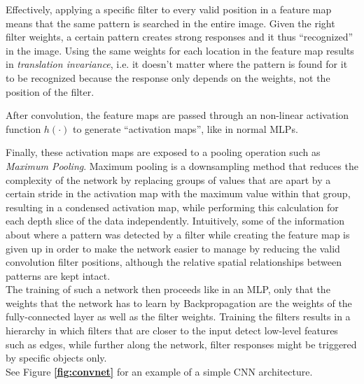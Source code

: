 Effectively, applying a specific filter to every valid position in a feature map means that the same pattern is searched in the entire image. Given the right filter weights, a certain pattern creates strong responses and it thus ``recognized'' in the image. Using the same weights for each location in the feature map results in \textit{translation invariance}, i.e. it doesn't matter where the pattern is found for it to be recognized because the response only depends on the weights, not the position of the filter.

After convolution, the feature maps are passed through an non-linear activation function $h(\cdot)$ to generate ``activation maps'', like in normal MLPs.

\noindent Finally, these activation maps are exposed to a pooling operation such as \textit{Maximum Pooling}. Maximum pooling is a downsampling method that reduces the complexity of the network by replacing groups of values that are apart by a certain stride in the activation map with the maximum value within that group, resulting in a condensed activation map, while performing this calculation for each depth slice of the data independently. Intuitively, some of the information about where a pattern was detected by a filter while creating the feature map is given up in order to make the network easier to manage by reducing the valid convolution filter positions, although the relative spatial relationships between patterns are kept intact. \cite[pp. 330-345]{deeplearning_book}\\

\noindent The training of such a network then proceeds like in an MLP, only that the weights that the network has to learn by Backpropagation are the weights of the fully-connected layer as well as the filter weights. Training the filters results in a hierarchy in which filters that are closer to the input detect low-level features such as edges, while further along the network, filter responses might be triggered by specific objects only.\\

\noindent See Figure \textbf{\ref{fig:convnet}} for an example of a simple CNN architecture.

